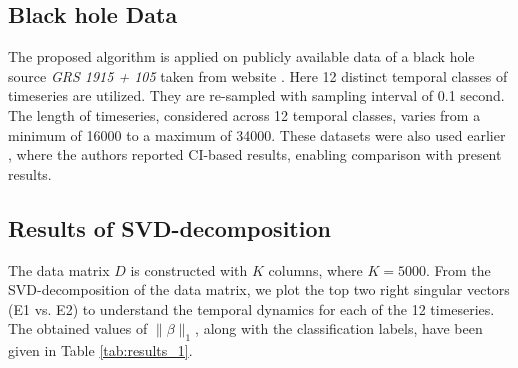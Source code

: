 \documentclass[journal]{IEEEtran}
\begin{document}
	\subsection{Black hole Data}
	The proposed algorithm is applied on publicly available data of a black hole source \textit{GRS 1915 + 105} taken from website \cite{xte}. Here 12 
	distinct temporal classes of timeseries are utilized. They are re-sampled with sampling interval of 0.1 second. The length of timeseries, considered across 12 temporal classes, varies from a minimum of 16000 to a maximum of 34000. These datasets  were  also used earlier  \cite{Adegoke2018}, where the authors reported CI-based results, enabling comparison with present results.

	\subsection{Results of SVD-decomposition}
	
	
	The data matrix $D$ is constructed with $K$ columns, where $K=5000$. From the SVD-decomposition of the data matrix, we plot the top two right singular vectors (E1 vs. E2) to understand the temporal dynamics for each of the 12 timeseries. The obtained values of $\|\beta\|_1$, along with the classification labels, have been given in Table \ref{tab:results_1}.
%	
	
	
\end{document}
